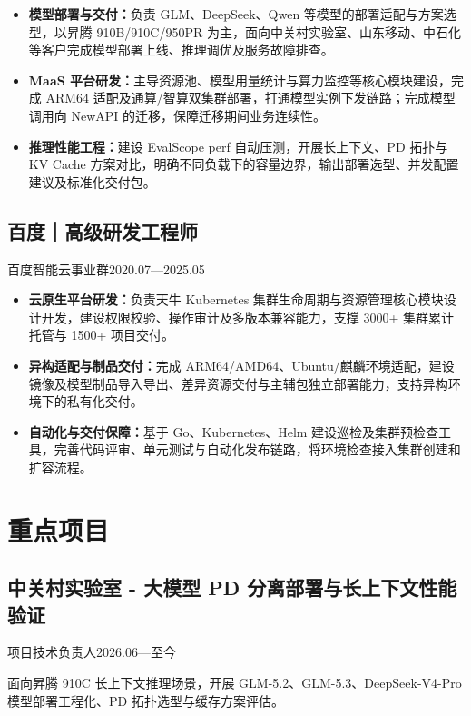 \documentclass{resume}
\newcommand{\entry}[3]{%
  \subsection*{#1}%
  {\small\color{resumegray}#2\hfill #3\par}\nopagebreak[4]
}
\begin{document}
\begin{itemize}

  \item \textbf{模型部署与交付：}负责 GLM、DeepSeek、Qwen 等模型的部署适配与方案选型，以昇腾 910B/910C/950PR 为主，面向中关村实验室、山东移动、中石化等客户完成模型部署上线、推理调优及服务故障排查。

  \item \textbf{MaaS 平台研发：}主导资源池、模型用量统计与算力监控等核心模块建设，完成 ARM64 适配及通算/智算双集群部署，打通模型实例下发链路；完成模型调用向 NewAPI 的迁移，保障迁移期间业务连续性。

  \item \textbf{推理性能工程：}建设 EvalScope perf 自动压测，开展长上下文、PD 拓扑与 KV Cache 方案对比，明确不同负载下的容量边界，输出部署选型、并发配置建议及标准化交付包。

\end{itemize}

\entry{百度｜高级研发工程师}{百度智能云事业群}{2020.07—2025.05}

\begin{itemize}

  \item \textbf{云原生平台研发：}负责天牛 Kubernetes 集群生命周期与资源管理核心模块设计开发，建设权限校验、操作审计及多版本兼容能力，支撑 3000+ 集群累计托管与 1500+ 项目交付。

  \item \textbf{异构适配与制品交付：}完成 ARM64/AMD64、Ubuntu/麒麟环境适配，建设镜像及模型制品导入导出、差异资源交付与主辅包独立部署能力，支持异构环境下的私有化交付。

  \item \textbf{自动化与交付保障：}基于 Go、Kubernetes、Helm 建设巡检及集群预检查工具，完善代码评审、单元测试与自动化发布链路，将环境检查接入集群创建和扩容流程。

\end{itemize}

\section{重点项目}

\entry{中关村实验室 - 大模型 PD 分离部署与长上下文性能验证}{项目技术负责人}{2026.06—至今}

面向昇腾 910C 长上下文推理场景，开展 GLM-5.2、GLM-5.3、DeepSeek-V4-Pro 模型部署工程化、PD 拓扑选型与缓存方案评估。\par
\end{document}
